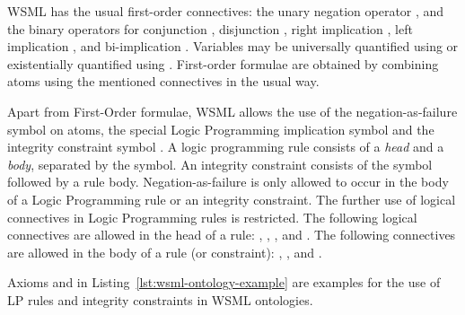 WSML has the usual first-order connectives: the unary negation
operator , and the binary operators for conjunction
, disjunction , right implication
, left implication , and bi-implication
. Variables may be universally
quantified using  or existentially quantified using
. First-order formulae are obtained by combining atoms
using the mentioned connectives in the usual way.
%

Apart from First-Order formulae, WSML allows the use of the
negation-as-failure symbol  on atoms, the special Logic
Programming implication symbol \synkw{:-} and the integrity
constraint symbol \synkw{!-}. A logic programming rule consists of a
\emph{head} and a \emph{body}, separated by the \synkw{:-} symbol.
An integrity constraint consists of the symbol \synkw{!-} followed
by a rule body. Negation-as-failure  is only allowed to
occur in the body of a Logic Programming rule or an integrity
constraint. The further use of logical connectives in Logic
Programming rules is restricted. The following logical connectives
are allowed in the head of a rule: , ,
, and . The following connectives
are allowed in the body of a rule (or constraint): ,
, and .
%

Axioms  and
 in Listing~\ref{lst:wsml-ontology-example}
are examples for the use of LP rules and integrity constraints in
WSML ontologies.

